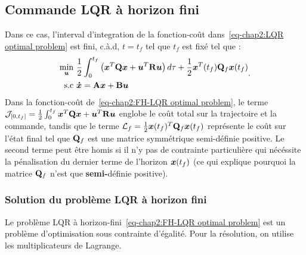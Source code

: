\subsection{Commande LQR à horizon fini}
Dans ce cas, l'interval d'integration de la fonction-coût dans~\eqref{eq-chap2:LQR optimal problem} est fini, c.à.d, $t=t_f$ tel que $t_f$ est fixé tel que : 
\begin{align}\label{eq-chap2:FH-LQR optimal problem}
	\begin{split}
		\underset{\bm{u}}{\min}~&\frac{1}{2}\int_0^{t_f}\left(\bm{x}^T\mathbf{Q}\bm{x} + \bm{u}^T\mathbf{R}\bm{u}\right) d\tau + \frac{1}{2}\bm{x}^T(t_f)\mathbf{Q}_f\bm{x}(t_f)\\
		{\rm s.c}~&\bm{\dot{x}} = \mathbf{A}\bm{x}+\mathbf{B}\bm{u}
	\end{split}.
\end{align}
Dans la fonction-coût de~\eqref{eq-chap2:FH-LQR optimal problem}, le terme ${\cal J}_{\left[0,t_f	\right]}=\frac{1}{2}\int_0^{t_f}\bm{x}^T\mathbf{Q}\bm{x} + \bm{u}^T\mathbf{R}\bm{u}$ englobe le coût total sur la trajectoire et la commande, tandis que le terme ${\cal L}_f=\frac{1}{2}\bm{x}(t_f)^T\mathbf{Q}_f\bm{x}(t_f)$ représente le coût sur l'état final tel que $\mathbf{Q}_f$ est une matrice symmétrique semi-définie positive. Le second terme peut être homis si il n'y pas de contrainte particulière qui nécéssite la pénalisation du dernier terme de l'horizon $\bm{x}(t_f)$ (ce qui explique pourquoi la matrice $\mathbf{Q}_f$ n'est que \textbf{semi-}définie positive).

\subsubsection{Solution du problème LQR à horizon fini}\label{subsubsec-chap2:solution FT-LQR}
Le problème LQR à horizon-fini~\eqref{eq-chap2:FH-LQR optimal problem} est un problème d'optimisation sous contrainte d'égalité. Pour la résolution, on utilise les multiplicateurs de Lagrange.  

